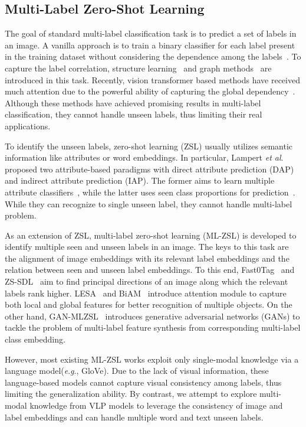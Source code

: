 \documentclass[letterpaper]{article} \usepackage{aaai23}  \usepackage{times}  \usepackage{helvet}  \usepackage{courier}  \usepackage[hyphens]{url}  \usepackage{graphicx} \urlstyle{rm} \def\UrlFont{\rm}  \usepackage{natbib}  \usepackage{caption} \frenchspacing  \setlength{\pdfpagewidth}{8.5in}  \setlength{\pdfpageheight}{11in}
\newcommand{\eg}{\textit{e}.\textit{g}.}
\newcommand{\etal}{\emph{et al}.}
\begin{document}
\subsection{Multi-Label Zero-Shot Learning}
The goal of standard multi-label classification task is to predict a set of labels in an image. 
A vanilla approach is to train a binary classifier for each label present in the training dataset without considering the dependence among the labels~\cite{tsoumakas2007multi, read2011classifier}. 
To capture the label correlation, structure learning~\cite{gong2014deep,Wang_2016_CVPR,Zhu_2017_CVPR,Wang_2017_ICCV} and graph methods~\cite{Li_2016_CVPR,Lee_2018_CVPR,Chen_2019_CVPR} are introduced in this task. 
Recently, vision transformer based methods have received much attention due to the powerful ability of  capturing the global dependency~\cite{lanchantin2021general,liu2021query2label,cheng2021mltr}.
Although these methods have achieved promising results in multi-label classification, they cannot handle unseen labels, thus limiting their real applications. \par
To identify the unseen labels, zero-shot learning (ZSL) usually utilizes semantic information like attributes or word embeddings\cite{mikolov2013distributed,Xian_2017_CVPR}.
In particular,
Lampert \etal~\cite{5206594} proposed two attribute-based paradigms with direct attribute prediction (DAP) and indirect attribute prediction (IAP). 
The former aims to learn multiple attribute classifiers~\cite{6571196}, while the latter uses seen class proportions for prediction~\cite{Zhang_2015_ICCV}. 
While they can recognize to single unseen label, they cannot handle multi-label problem. 
\par
As an extension of ZSL,
multi-label zero-shot learning (ML-ZSL) is developed to identify multiple seen and unseen labels in an image.
The keys to this task are the alignment of image embeddings with its relevant label embeddings and the relation between seen and unseen label embeddings.
To this end, Fast0Tag~\cite{fast0tag} and ZS-SDL~\cite{zssdl} aim to find principal directions of an image along which the relevant labels rank higher.
LESA~\cite{lesa} and BiAM~\cite{biam} introduce attention module to capture both local and global features for better recognition of multiple objects.
On the other hand, GAN-MLZSL~\cite{ganmlzsl} introduces generative adversarial networks (GANs) to tackle the problem of multi-label feature synthesis from corresponding multi-label class embedding. \par
However, most existing ML-ZSL works exploit only single-modal knowledge via a language model(\eg, GloVe).
Due to the lack of visual information, these language-based models cannot capture visual consistency among labels, thus limiting the generalization ability.
By contrast, we attempt to explore multi-modal knowledge from VLP models to leverage the consistency of image and label embeddings and  can handle multiple word and text unseen labels.
\end{document}
